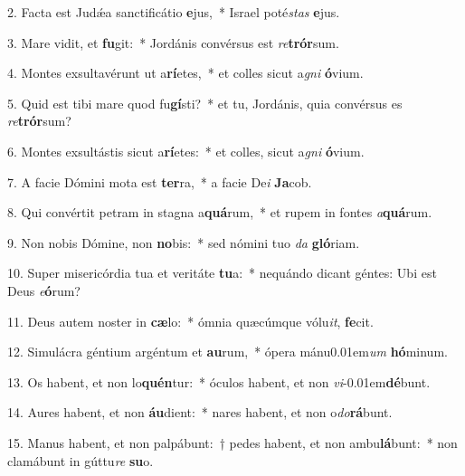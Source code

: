 \item 2. Facta est Judǽa sanctificátio \textbf{e}jus,~* Israel poté\hspace{0.03em}\textit{stas} \textbf{e}jus.

\item 3. Mare vidit, et \textbf{fu}git:~* Jordánis convérsus est \textit{re}\textbf{trór}sum.

\item 4. Montes exsultavérunt ut a\textbf{rí}etes,~* et colles sicut a\textit{gni} \textbf{ó}vium.

\item 5. Quid est tibi mare quod fu\textbf{gí}sti?~* et tu, Jordánis, quia convérsus es \textit{re}\textbf{trór}sum?

\item 6. Montes exsultástis sicut a\textbf{rí}etes:~* et colles, sicut a\textit{gni} \textbf{ó}vium.

\item 7. A facie Dómini mota est \textbf{ter}ra,~* a facie De\textit{i} \textbf{Ja}cob.

\item 8. Qui convértit petram in stagna a\textbf{quá}rum,~* et rupem in fontes \textit{a}\textbf{quá}rum.

\item 9. Non nobis Dómine, non \textbf{no}bis:~* sed nómini tuo \textit{da} \textbf{gló}riam.

\item 10. Super misericórdia tua et veritáte \textbf{tu}a:~* nequándo dicant géntes: Ubi est Deus \textit{e}\textbf{ó}rum?

\item 11. Deus autem noster in \textbf{cæ}lo:~* ómnia quæcúmque vólu\textit{it}, \textbf{fe}cit.

\item 12. Simulácra géntium argéntum et \textbf{au}rum,~* ópera mánu\kern 0.01em\textit{um} \textbf{hó}minum.

\item 13. Os habent, et non lo\textbf{quén}tur:~* óculos habent, et non \textit{vi}\kern -0.01em\textbf{dé}bunt.

\item 14. Aures habent, et non \textbf{áu}dient:~* nares habent, et non o\textit{do}\textbf{rá}bunt.

\item 15. Manus habent, et non palpábunt:~† pedes habent, et non ambu\textbf{lá}bunt:~* non clamábunt in gúttu\textit{re} \textbf{su}o.

